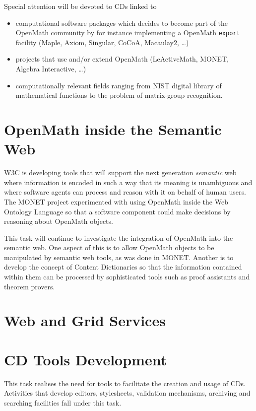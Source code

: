 \documentclass{euproposal}
\begin{document}
Special attention will be devoted to CDs linked to 
\begin{itemize}
  
\item computational software packages which decides to become part of
  the OpenMath community by for instance implementing a OpenMath
  \texttt{export} facility (Maple, Axiom, Singular, CoCoA, Macaulay2,
  \ldots)
  
\item projects that use and/or extend OpenMath (LeActiveMath, MONET,
  Algebra Interactive, \ldots)
  
\item computationally relevant fields ranging from NIST digital
  library of mathematical functions to the problem of matrix-group
  recognition.

\end{itemize}

\section{OpenMath inside the Semantic Web}

W3C is developing tools that will support the next generation
\emph{semantic} web where information is encoded in such a way that its
meaning is unambiguous and where software agents can process and reason
with it on behalf of human users.  The MONET project experimented with
using OpenMath inside the Web Ontology Language so that a software
component could make decisions by reasoning about OpenMath objects.

This task will continue to investigate the integration of OpenMath into
the semantic web.  One aspect of this is to allow OpenMath objects to be
manipulated by semantic web tools, as was done in MONET.  Another is to
develop the concept of Content Dictionaries so that the information
contained within them can be processed by sophisticated tools such as
proof assistants and theorem provers.

\section{Web and Grid Services}


\section{CD Tools Development} 
\label{tools}

This task realises the need for tools to facilitate the creation and
usage of CDs. Activities that develop editors, stylesheets, validation
mechanisms, archiving and searching facilities fall under this task.
\end{document}

